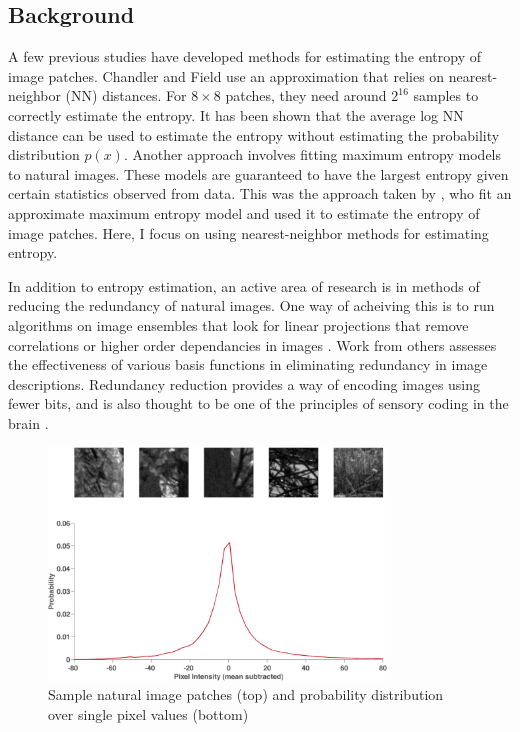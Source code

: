 \documentclass[10pt,twocolumn,letterpaper]{article}
\begin{document}

\subsection{Background}
A few previous studies \cite{petrov,chandlerfield} have developed methods for estimating the entropy of image patches. Chandler and Field use an approximation that relies on nearest-neighbor (NN) distances. For $8\times8$ patches, they need around $2^{16}$ samples to correctly estimate the entropy. It has been shown \cite{entropyest} that the average log NN distance can be used to estimate the entropy without estimating the probability distribution $p(x)$. Another approach involves fitting maximum entropy models to natural images. These models are guaranteed to have the largest entropy given certain statistics observed from data. This was the approach taken by \cite{maxen}, who fit an approximate maximum entropy model and used it to estimate the entropy of image patches.
Here, I focus on using nearest-neighbor methods for estimating entropy.

In addition to entropy estimation, an active area of research is in methods of reducing the redundancy of natural images.
One way of acheiving this is to run algorithms on image ensembles that look for linear projections that remove correlations or higher order dependancies in images \cite{nis}.
Work from others \cite{bethge,nicv1} assesses the effectiveness of various basis functions in eliminating redundancy in image descriptions.
Redundancy reduction provides a way of encoding images using fewer bits, and is also thought to be one of the principles of sensory coding in the brain \cite{barlow}.

\begin{figure}[h]
\begin{center}
   \includegraphics[width=0.8\textwidth]{example_patches.png}
   \caption{Sample natural image patches (top) and probability distribution over single pixel values (bottom)}
    \label{fig:ex}
\end{center}
\end{figure}
\end{document}
